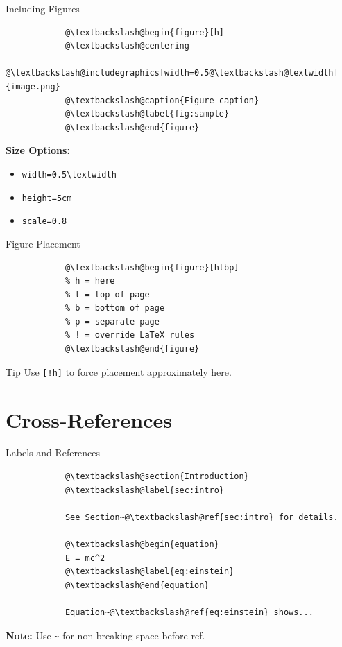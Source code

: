 \documentclass[aspectratio=169]{beamer}
\begin{document}
	\begin{frame}[fragile]{Including Figures}
		\begin{lstlisting}
			@\textbackslash@begin{figure}[h]
			@\textbackslash@centering
			@\textbackslash@includegraphics[width=0.5@\textbackslash@textwidth]{image.png}
			@\textbackslash@caption{Figure caption}
			@\textbackslash@label{fig:sample}
			@\textbackslash@end{figure}
		\end{lstlisting}
		
		\vspace{1em}
		
		\textbf{Size Options:}
		\begin{itemize}
			\item \texttt{width=0.5\textbackslash textwidth}
			\item \texttt{height=5cm}
			\item \texttt{scale=0.8}
		\end{itemize}
	\end{frame}
	
	\begin{frame}[fragile]{Figure Placement}
		\begin{lstlisting}
			@\textbackslash@begin{figure}[htbp]
			% h = here
			% t = top of page
			% b = bottom of page
			% p = separate page
			% ! = override LaTeX rules
			@\textbackslash@end{figure}
		\end{lstlisting}
		
		\vspace{1em}
		
		\begin{alertblock}{Tip}
			Use \texttt{[!h]} to force placement approximately here.
		\end{alertblock}
	\end{frame}
	
	\section{Cross-References}
	
	\begin{frame}[fragile]{Labels and References}
		\begin{lstlisting}
			@\textbackslash@section{Introduction}
			@\textbackslash@label{sec:intro}
			
			See Section~@\textbackslash@ref{sec:intro} for details.
			
			@\textbackslash@begin{equation}
			E = mc^2
			@\textbackslash@label{eq:einstein}
			@\textbackslash@end{equation}
			
			Equation~@\textbackslash@ref{eq:einstein} shows...
		\end{lstlisting}
		
		\vspace{0.5em}
		
		\textbf{Note:} Use \texttt{\textasciitilde} for non-breaking space before ref.
	\end{frame}
	
\end{document}
